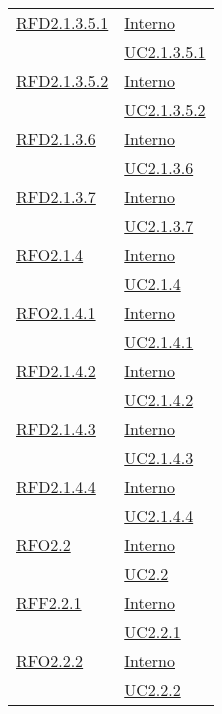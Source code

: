 \begin{longtable}{|>{\centering}m{5cm}|m{5cm}<{\centering}|}
\hyperlink{RFD2.1.3.5.1}{RFD2.1.3.5.1} & \hyperlink{Interno}{Interno}\\
& \hyperref[UC2.1.3.5.1]{UC2.1.3.5.1}\\ \hline

\hyperlink{RFD2.1.3.5.2}{RFD2.1.3.5.2} & \hyperlink{Interno}{Interno}\\
& \hyperref[UC2.1.3.5.2]{UC2.1.3.5.2}\\ \hline

\hyperlink{RFD2.1.3.6}{RFD2.1.3.6} & \hyperlink{Interno}{Interno}\\
& \hyperref[UC2.1.3.6]{UC2.1.3.6}\\ \hline

\hyperlink{RFD2.1.3.7}{RFD2.1.3.7} & \hyperlink{Interno}{Interno}\\
& \hyperref[UC2.1.3.7]{UC2.1.3.7}\\ \hline

\hyperlink{RFO2.1.4}{RFO2.1.4} & \hyperlink{Interno}{Interno}\\
& \hyperref[UC2.1.4]{UC2.1.4}\\ \hline

\hyperlink{RFO2.1.4.1}{RFO2.1.4.1} & \hyperlink{Interno}{Interno}\\
& \hyperref[UC2.1.4.1]{UC2.1.4.1}\\ \hline

\hyperlink{RFD2.1.4.2}{RFD2.1.4.2} & \hyperlink{Interno}{Interno}\\
& \hyperref[UC2.1.4.2]{UC2.1.4.2}\\ \hline

\hyperlink{RFD2.1.4.3}{RFD2.1.4.3} & \hyperlink{Interno}{Interno}\\
& \hyperref[UC2.1.4.3]{UC2.1.4.3}\\ \hline

\hyperlink{RFD2.1.4.4}{RFD2.1.4.4} & \hyperlink{Interno}{Interno}\\
& \hyperref[UC2.1.4.4]{UC2.1.4.4}\\ \hline

\hyperlink{RFO2.2}{RFO2.2} & \hyperlink{Interno}{Interno}\\
& \hyperref[UC2.2]{UC2.2}\\ \hline

\hyperlink{RFF2.2.1}{RFF2.2.1} & \hyperlink{Interno}{Interno}\\
& \hyperref[UC2.2.1]{UC2.2.1}\\ \hline

\hyperlink{RFO2.2.2}{RFO2.2.2} & \hyperlink{Interno}{Interno}\\
& \hyperref[UC2.2.2]{UC2.2.2}\\ \hline


\end{longtable}
